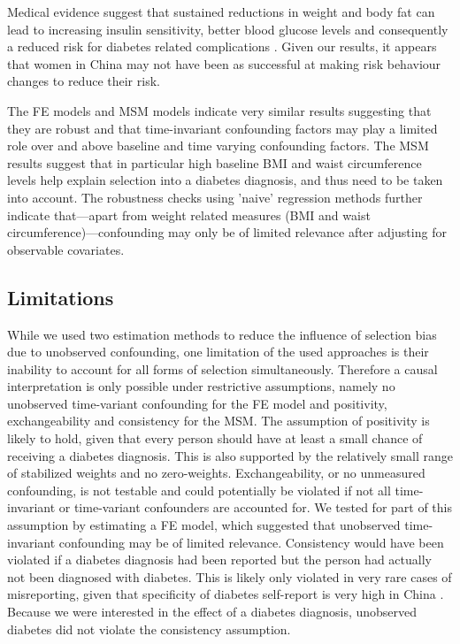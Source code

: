 Medical evidence suggest that sustained reductions in weight and body fat can lead to increasing insulin sensitivity, better blood glucose levels and consequently a reduced risk for diabetes related complications \parencite{Long2014,Zhou2016}. Given our results, it appears that women in China may not have been as successful at making risk behaviour changes to reduce their risk.

The \ac{FE} models and \ac{MSM} models indicate very similar results suggesting that they are robust and that time-invariant confounding factors may play a limited role over and above baseline and time varying confounding factors. The MSM results suggest that in particular high baseline BMI and waist circumference levels help explain selection into a diabetes diagnosis, and thus need to be taken into account. The robustness checks using 'naive' regression methods further indicate that---apart from weight related measures (BMI and waist circumference)---confounding may only be of limited relevance after adjusting for observable covariates.

\subsection{Limitations}

While we used two estimation methods to reduce the influence of selection bias due to unobserved confounding, one limitation of the used approaches is their inability to account for all forms of selection simultaneously. Therefore a causal interpretation is only possible under restrictive assumptions, namely no unobserved time-variant confounding for the \ac{FE} model and positivity, exchangeability and consistency for the \ac{MSM}. The assumption of positivity is likely to hold, given that every person should have at least a small chance of receiving a diabetes diagnosis. This is also supported by the relatively small range of stabilized weights and no zero-weights. Exchangeability, or no unmeasured confounding, is not testable and could potentially be violated if not all time-invariant or time-variant confounders are accounted for. We tested for part of this assumption by estimating a \ac{FE} model, which suggested that unobserved time-invariant confounding may be of limited relevance. Consistency would have been violated if a diabetes diagnosis had been reported but the person had actually not been diagnosed with diabetes. This is likely only violated in very rare cases of misreporting, given that specificity of diabetes self-report is very high in China \autocite{Yuan2015}. Because we were interested in the effect of a diabetes diagnosis, unobserved diabetes did not violate the consistency assumption.

